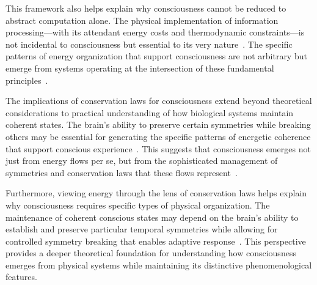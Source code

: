 This framework also helps explain why consciousness cannot be reduced to abstract computation alone. The physical implementation of information processing—with its attendant energy costs and thermodynamic constraints—is not incidental to consciousness but essential to its very nature~. The specific patterns of energy organization that support consciousness are not arbitrary but emerge from systems operating at the intersection of these fundamental principles~.

The implications of conservation laws for consciousness extend beyond theoretical considerations to practical understanding of how biological systems maintain coherent states. The brain's ability to preserve certain symmetries while breaking others may be essential for generating the specific patterns of energetic coherence that support conscious experience~\cite{breakspear2005dynamics}. This suggests that consciousness emerges not just from energy flows per se, but from the sophisticated management of symmetries and conservation laws that these flows represent~\cite{kelso2012}.

Furthermore, viewing energy through the lens of conservation laws helps explain why consciousness requires specific types of physical organization. The maintenance of coherent conscious states may depend on the brain's ability to establish and preserve particular temporal symmetries while allowing for controlled symmetry breaking that enables adaptive response~\cite{demetrius2015}. This perspective provides a deeper theoretical foundation for understanding how consciousness emerges from physical systems while maintaining its distinctive phenomenological features.

